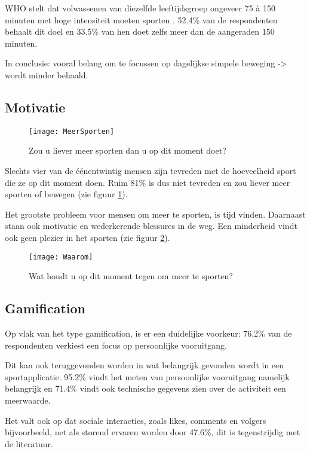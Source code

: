 WHO stelt dat volwassenen van diezelfde leeftijdsgroep ongeveer 75 à 150 minuten met hoge intensiteit moeten sporten \autocite{Bull2020}.
52.4\% van de respondenten behaalt dit doel en 33.5\% van hen doet zelfs meer dan de aangeraden 150 minuten.

In conclusie: vooral belang om te focussen op dagelijkse simpele beweging -> wordt minder behaald.

\subsection{Motivatie}

\begin{figure}[h]
    \caption[Zou u liever meer sporten dan u op dit moment doet?]{Zou u liever meer sporten dan u op dit moment doet?}
    \texttt{[image: MeerSporten]}
    \label{fig:meerBewegen}
\end{figure}

Slechts vier van de éénentwintig mensen zijn tevreden met de hoeveelheid sport die ze op dit moment doen. Ruim 81\% is dus niet tevreden en zou liever meer sporten of bewegen (zie figuur \ref{fig:meerBewegen}).

Het grootste probleem voor mensen om meer te sporten, is tijd vinden. Daarnaast staan ook motivatie en wederkerende blessures in de weg. Een minderheid vindt ook geen plezier in het sporten (zie figuur \ref{fig:waarom}).

\begin{figure}[h]
    \caption[Wat houdt u op dit moment tegen om meer te sporten?]{Wat houdt u op dit moment tegen om meer te sporten?}
    \texttt{[image: Waarom]}
    \label{fig:waarom}
\end{figure}

\subsection{Gamification}

Op vlak van het type gamification, is er een duidelijke voorkeur: 76.2\% van de respondenten verkiest een focus op persoonlijke vooruitgang.

Dit kan ook teruggevonden worden in wat belangrijk gevonden wordt in een sportapplicatie. 95.2\% vindt het meten van persoonlijke vooruitgang namelijk belangrijk en 71.4\% vindt ook technische gegevens zien over de activiteit een meerwaarde.

Het valt ook op dat sociale interacties, zoals likes, comments en volgers bijvoorbeeld, net als storend ervaren worden door 47.6\%, dit is tegenstrijdig met de literatuur.

